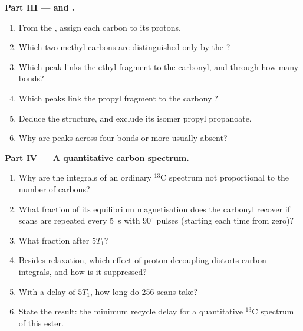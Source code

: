\begin{problem}
\medskip\noindent\textbf{Part III ---  and .}
\begin{enumerate}[resume]
  \item From the , assign each carbon to its protons.
  \item Which two methyl carbons are distinguished only by the ?
  \item Which  peak links the ethyl fragment to the carbonyl, and through
        how many bonds?
  \item Which  peaks link the propyl fragment to the carbonyl?
  \item Deduce the structure, and exclude its isomer propyl propanoate.
  \item Why are  peaks across four bonds or more usually absent?
\end{enumerate}

\medskip\noindent\textbf{Part IV --- A quantitative carbon spectrum.}
\begin{enumerate}[resume]
  \item Why are the integrals of an ordinary ${}^{13}$C spectrum not proportional to
        the number of carbons?
  \item What fraction of its equilibrium magnetisation does the carbonyl recover
        if scans are repeated every \qty{5}{s} with $90^\circ$ pulses (starting each time
        from zero)?
  \item What fraction after $5T_1$?
  \item Besides relaxation, which effect of proton decoupling distorts carbon
        integrals, and how is it suppressed?
  \item With a delay of $5T_1$, how long do 256 scans take?
  \item State the result: the minimum recycle delay for a quantitative ${}^{13}$C
        spectrum of this ester.
\end{enumerate}
\end{problem}
